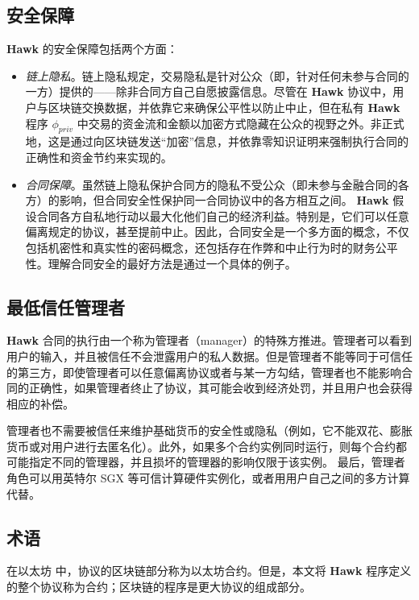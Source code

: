 \documentclass{xduugtrans}
\begin{document}
\subsection{安全保障}

\textbf{Hawk} 的安全保障包括两个方面：

\begin{itemize}
    \item \textit{链上隐私}。链上隐私规定，交易隐私是针对公众（即，针对任何未参与合同的一方）提供的——除非合同方自己自愿披露信息。尽管在 \textbf{Hawk} 协议中，用户与区块链交换数据，并依靠它来确保公平性以防止中止，但在私有 \textbf{Hawk} 程序 $\phi _{priv}$ 中交易的资金流和金额以加密方式隐藏在公众的视野之外。非正式地，这是通过向区块链发送“加密”信息，并依靠零知识证明来强制执行合同的正确性和资金节约来实现的。
    \item \textit{合同保障}。虽然链上隐私保护合同方的隐私不受公众（即未参与金融合同的各方）的影响，但合同安全性保护同一合同协议中的各方相互之间。 \textbf{Hawk} 假设合同各方自私地行动以最大化他们自己的经济利益。特别是，它们可以任意偏离规定的协议，甚至提前中止。因此，合同安全是一个多方面的概念，不仅包括机密性和真实性的密码概念，还包括存在作弊和中止行为时的财务公平性。理解合同安全的最好方法是通过一个具体的例子。
\end{itemize}

\subsection{最低信任管理者}

\textbf{Hawk} 合同的执行由一个称为管理者（manager）的特殊方推进。管理者可以看到用户的输入，并且被信任不会泄露用户的私人数据。但是管理者不能等同于可信任的第三方，即使管理者可以任意偏离协议或者与某一方勾结，管理者也不能影响合同的正确性，如果管理者终止了协议，其可能会收到经济处罚，并且用户也会获得相应的补偿。

管理者也不需要被信任来维护基础货币的安全性或隐私（例如，它不能双花、膨胀货币或对用户进行去匿名化）。此外，如果多个合约实例同时运行，则每个合约都可能指定不同的管理器，并且损坏的管理器的影响仅限于该实例。 最后，管理者角色可以用英特尔 SGX 等可信计算硬件实例化，或者用用户自己之间的多方计算代替。

\subsection{术语}

在以太坊 \cite{ref57} 中，协议的区块链部分称为以太坊合约。但是，本文将 \textbf{Hawk} 程序定义的整个协议称为合约；区块链的程序是更大协议的组成部分。
\end{document}
